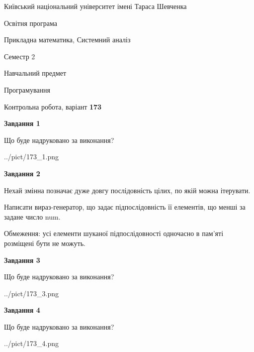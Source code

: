 \documentclass[12pt, ukrainian]{article}
\begin{document}
{{\begin {small}\par
{ \center  Київський національний університет імені Тараса Шевченка \par}
{\parbox {5 cm}{Освітня програма \hfill}{\parbox {8 cm}{Прикладна математика, Системний аналіз \hfill}}\parbox {5 cm}{\hfill Семестр 2}}\par
{\parbox {5 cm} {Навчальний предмет \hfill}\parbox {7 cm}{Програмування \hfill}\parbox {6cm}{\hfill}\par}\vspace{-7pt} \end{small}}{\center Контрольна робота, варіант  \No \textbf
{ 173 }\par}}
{
\begin {large}
{\begin {center}\textbf{Завдання 1}\end {center}}\par
Що буде надруковано за виконання?\par\par
\begin{center}
	{../pict/173_1.png}
\end{center}
\newpage

{\begin {center}\textbf{Завдання 2}\end {center}}\par
Нехай змінна  позначає дуже довгу послідовність цілих, по якій можна ітерувати.

Написати вираз-генератор, що задає підпослідовність її елементів, що менші за задане число num.

Обмеження: усі елементи шуканої підпослідовності одночасно в пам'яті розміщені бути не можуть.\par
\newpage

{\begin {center}\textbf{Завдання 3}\end {center}}\par
Що буде надруковано за виконання?\par
\begin{center}
	{../pict/173_3.png}
\end{center}
\newpage

{\begin {center}\textbf{Завдання 4}\end {center}}\par
Що буде надруковано за виконання?\par
\begin{center}
	{../pict/173_4.png}
\end{center}
\newpage


\end{large}}
\end{document}
